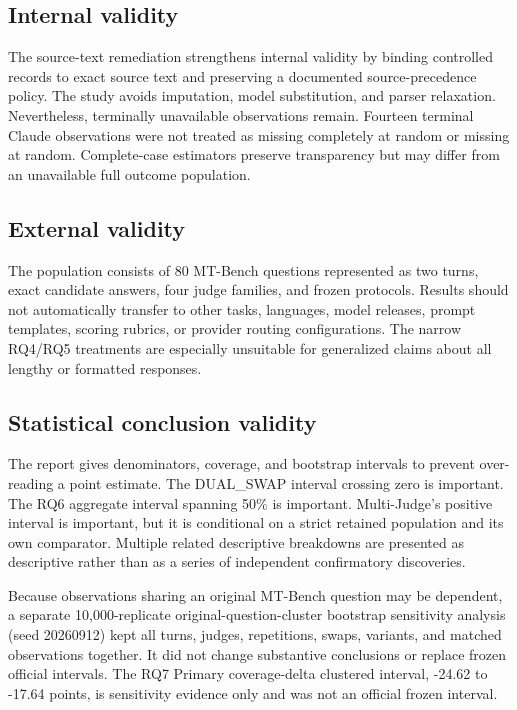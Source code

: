 \subsection{Internal validity}
The source-text remediation strengthens internal validity by binding controlled records to exact source text and preserving a documented source-precedence policy. The study avoids imputation, model substitution, and parser relaxation. Nevertheless, terminally unavailable observations remain. Fourteen terminal Claude observations were not treated as missing completely at random or missing at random. Complete-case estimators preserve transparency but may differ from an unavailable full outcome population.

\subsection{External validity}
The population consists of 80 MT-Bench questions represented as two turns, exact candidate answers, four judge families, and frozen protocols. Results should not automatically transfer to other tasks, languages, model releases, prompt templates, scoring rubrics, or provider routing configurations. The narrow RQ4/RQ5 treatments are especially unsuitable for generalized claims about all lengthy or formatted responses.

\subsection{Statistical conclusion validity}
The report gives denominators, coverage, and bootstrap intervals to prevent over-reading a point estimate. The DUAL\_SWAP interval crossing zero is important. The RQ6 aggregate interval spanning 50\% is important. Multi-Judge's positive interval is important, but it is conditional on a strict retained population and its own comparator. Multiple related descriptive breakdowns are presented as descriptive rather than as a series of independent confirmatory discoveries.

Because observations sharing an original MT-Bench question may be dependent, a separate 10,000-replicate original-question-cluster bootstrap sensitivity analysis (seed 20260912) kept all turns, judges, repetitions, swaps, variants, and matched observations together. It did not change substantive conclusions or replace frozen official intervals. The RQ7 Primary coverage-delta clustered interval, -24.62 to -17.64 points, is sensitivity evidence only and was not an official frozen interval.

